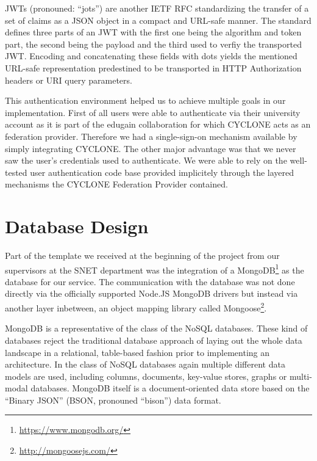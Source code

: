 JWTs (pronouned: \enquote{jots}) are another IETF RFC \cite{bradley2015json} standardizing the transfer of a set of claims as a JSON object in a compact and URL-safe manner. The standard defines three parts of an JWT with the first one being the algorithm and token part, the second being the payload and the third used to verfiy the transported JWT. Encoding and concatenating these fields with dots yields the mentioned URL-safe representation predestined to be transported in HTTP Authorization headers or URI query parameters.

This authentication environment helped us to achieve multiple goals in our implementation. First of all users were able to authenticate via their university account as it is part of the edugain collaboration for which CYCLONE acts as an federation provider. Therefore we had a single-sign-on mechanism available by simply integrating CYCLONE. The other major advantage was that we never saw the user's credentials used to authenticate. We were able to rely on the well-tested user authentication code base provided implicitely through the layered mechanisms the CYCLONE Federation Provider contained.


\vspace{0.5cm}

\section{Database Design}

Part of the template we received at the beginning of the project from our supervisors at the SNET department was the integration of a MongoDB\footnote{\url{https://www.mongodb.org/}} as the database for our service. The communication with the database was not done directly via the officially supported Node.JS MongoDB drivers but instead via another layer inbetween, an object mapping library called Mongoose\footnote{\url{http://mongoosejs.com/}}.

MongoDB is a representative of the class of the NoSQL databases. These kind of databases reject the traditional database approach of laying out the whole data landscape in a relational, table-based fashion prior to implementing an architecture. In the class of NoSQL databases again multiple different data models are used, including columns, documents, key-value stores, graphs or multi-modal databases. MongoDB itself is a document-oriented data store based on the \enquote{Binary JSON} (BSON, pronouned \enquote{bison}) data format.

